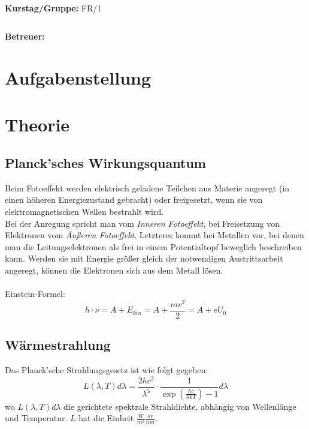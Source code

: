 \documentclass{article}
\begin{document}
\begin{verbatim}


\end{verbatim}
			\begin{flushleft}
			\textbf{\Large{Kurstag/Gruppe:}} \Large{FR/1}
			\end{flushleft}

\begin{verbatim}

\end{verbatim}
			\begin{flushleft}
			\LARGE{\textbf{Betreuer:\Large{ }}}		
			\end{flushleft}
\newpage
			
\section{Aufgabenstellung}
\section{Theorie}
\subsection{Planck'sches Wirkungsquantum}
Beim Fotoeffekt werden elektrisch geladene Teilchen aus Materie angeregt (in einen höheren Energiezustand gebracht) oder freigesetzt, wenn sie von elektromagnetischen Wellen bestrahlt wird.\\
Bei der Anregung spricht man vom \textit{Inneren Fotoeffekt}, bei Freisetzung von Elektronen vom \textit{Äußeren Fotoeffekt}. Letzteres kommt bei Metallen vor, bei denen man die Leitungselektronen als frei in einem Potentialtopf beweglich beschreiben kann. Werden sie mit Energie größer gleich der notwendigen Austrittsarbeit angeregt, können die Elektronen sich aus dem Metall lösen.\\
\\
Einstein-Formel:
$$h\cdot\nu=A+E_{kin}=A+\frac{mv^2}{2}=A+eU_0$$


\subsection{Wärmestrahlung}
Das Planck'sche Strahlungsgesetz ist wie folgt gegeben:
\begin{equation}
L(\lambda,T)d\lambda = \frac{2hc^2}{\lambda^5} \cdot \frac{1}{\exp\left(\frac{hc}{\lambda kT}\right) -1} d\lambda
\label{strahlungsgesetz}
\end{equation}
wo $L(\lambda,T)d\lambda$ die gerichtete spektrale Strahldichte, abhängig von Wellenlänge und Temperatur. $L$ hat die Einheit $\frac{W}{m^2}\frac{sr}{nm}$.\\
\\
\end{document}
